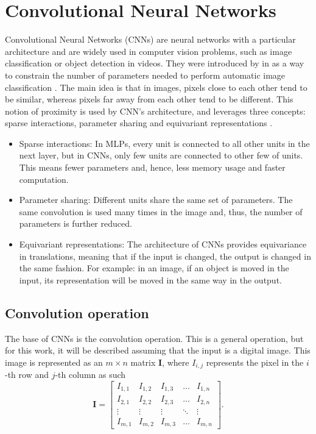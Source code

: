 \section{Convolutional Neural Networks}

Convolutional Neural Networks (CNNs) are neural networks with a particular architecture and are widely used in computer vision problems, such as image classification or object detection in videos. They were introduced by \citeauthor{lecun1989generalization} in \citeyear{lecun1989generalization} as a way to constrain the number of parameters needed to perform automatic image classification \cite{lecun1989generalization}. The main idea is that in images, pixels close to each other tend to be similar, whereas pixels far away from each other tend to be different. This notion of proximity is used by CNN's architecture, and leverages three concepts: sparse interactions, parameter sharing and equivariant representations \cite[p.~335]{bengio2015deep}.

\begin{itemize}
  \item Sparse interactions: In MLPs, every unit is connected to all other units in the next layer, but in CNNs, only few units are connected to other few of units. This means fewer parameters and, hence, less memory usage and faster computation.
  \item Parameter sharing: Different units share the same set of parameters. The same convolution is used many times in the image and, thus, the number of parameters is further reduced.
  \item Equivariant representations: The architecture of CNNs provides equivariance in translations, meaning that if the input is changed, the output is changed in the same fashion. For example: in an image, if an object is moved in the input, its representation will be moved in the same way in the output.
\end{itemize}

\subsection{Convolution operation}

The base of CNNs is the convolution operation. This is a general operation, but for this work, it will be described assuming that the input is a digital image. This image is represented as an $m \times n$ matrix $\boldsymbol{I}$, where $I_{i,j}$ represents the pixel in the $i$-th row and $j$-th column as such
\begin{equation}
  \boldsymbol{I} =
    \begin{bmatrix}
      I_{1,1} & I_{1,2} & I_{1,3} & \dots  & I_{1,n} \\
      I_{2,1} & I_{2,2} & I_{2,3} & \dots  & I_{2,n} \\
      \vdots & \vdots & \vdots & \ddots & \vdots \\
      I_{m,1} & I_{m,2} & I_{m,3} & \dots  & I_{m,n}
    \end{bmatrix}.
\end{equation}

